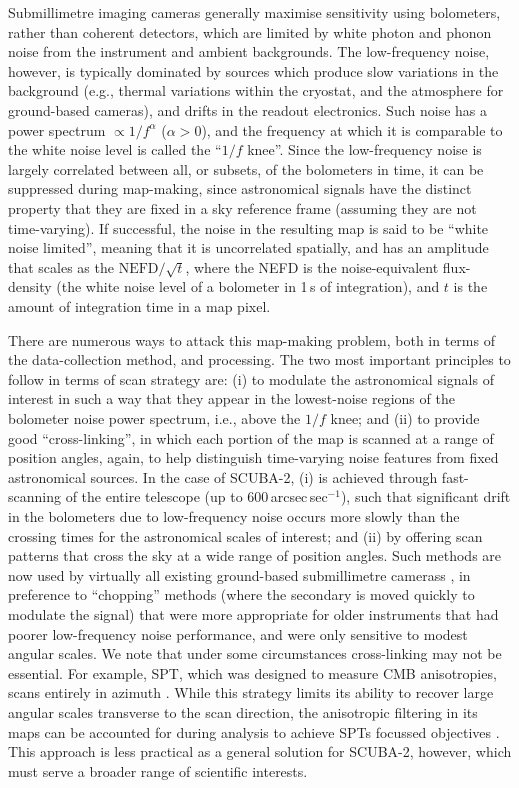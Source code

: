 \documentclass[useAMS,usenatbib,nofootinbib]{mn2e}
\newcommand{\scuba}{SCUBA-2}
\begin{document}
Submillimetre imaging cameras generally maximise sensitivity using
bolometers, rather than coherent detectors, which are limited by white
photon and phonon noise from the instrument and ambient
backgrounds. The low-frequency noise, however, is typically dominated
by sources which produce slow variations in the background (e.g.,
thermal variations within the cryostat, and the atmosphere for
ground-based cameras), and drifts in the readout electronics. Such
noise has a power spectrum $\propto 1/f^\alpha$ ($\alpha>0$), and the
frequency at which it is comparable to the white noise level is called
the ``$1/f$ knee''. Since the low-frequency noise is largely
correlated between all, or subsets, of the bolometers in time, it can
be suppressed during map-making, since astronomical signals have the
distinct property that they are fixed in a sky reference frame
(assuming they are not time-varying). If successful, the noise in the
resulting map is said to be ``white noise limited'', meaning that it
is uncorrelated spatially, and has an amplitude that scales as the
$\mathrm{NEFD}/\sqrt{t}$, where the NEFD is the noise-equivalent
flux-density (the white noise level of a bolometer in 1\,s of
integration), and $t$ is the amount of integration time in a map
pixel.

There are numerous ways to attack this map-making problem, both in
terms of the data-collection method, and processing. The two most
important principles to follow in terms of scan strategy are: (i) to
modulate the astronomical signals of interest in such a way that they
appear in the lowest-noise regions of the bolometer noise power
spectrum, i.e., above the $1/f$ knee; and (ii) to provide good
``cross-linking'', in which each portion of the map is scanned at a
range of position angles, again, to help distinguish time-varying
noise features from fixed astronomical sources. In the case of \scuba,
(i) is achieved through fast-scanning of the entire telescope (up to
600\,arcsec\,sec$^{-1}$), such that significant drift in the
bolometers due to low-frequency noise occurs more slowly than the
crossing times for the astronomical scales of interest; and (ii) by
offering scan patterns that cross the sky at a wide range of position
angles. Such methods are now used by virtually all existing
ground-based submillimetre camerass
\citep[e.g.,][]{glenn1998,weferling2002,wilson2008,kovacs2008b}, in
preference to ``chopping'' methods (where the secondary is moved
quickly to modulate the signal) that were more appropriate for older
instruments that had poorer low-frequency noise performance, and were
only sensitive to modest angular scales. We note that under some
circumstances cross-linking may not be essential. For example, SPT,
which was designed to measure CMB anisotropies, scans entirely in
azimuth \citep{schaffer2011}. While this strategy limits its ability
to recover large angular scales transverse to the scan direction, the
anisotropic filtering in its maps can be accounted for during analysis
to achieve SPTs focussed objectives \citep[in contrast, the similar
ACT experiment uses cross-linking to improve its reponse to
large-angular scales,][]{das2011}. This approach is less practical as
a general solution for \scuba, however, which must serve a broader
range of scientific interests.
\end{document}
